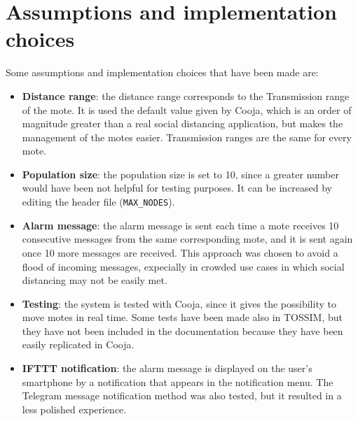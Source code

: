 \documentclass[11pt]{article}
\begin{document}
\section{Assumptions and implementation choices}
Some assumptions and implementation choices that have been made are:
\begin{itemize}
  \item \textbf{Distance range}: the distance range corresponds to the Transmission range of the mote. It is used the default value given by Cooja, which is an order of magnitude greater than a real social distancing application, but makes the management of the motes easier. Transmission ranges are the same for every mote.
  \item \textbf{Population size}: the population size is set to 10, since a greater number would have been not helpful for testing purposes. It can be increased by editing the header file (\texttt{MAX\_NODES}).
  \item \textbf{Alarm message}: the alarm message is sent each time a mote receives 10 consecutive messages from the same corresponding mote, and it is sent again once 10 more messages are received. This approach was chosen to avoid a flood of incoming messages, expecially in crowded use cases in which social distancing may not be easily met.
  \item \textbf{Testing}: the system is tested with Cooja, since it gives the possibility to move motes in real time. Some tests have been made also in TOSSIM, but they have not been included in the documentation because they have been easily replicated in Cooja.
  \item \textbf{IFTTT notification}: the alarm message is displayed on the user's smartphone by a notification that appears in the notification menu. The Telegram message notification method was also tested, but it resulted in a less polished experience.
\end{itemize}
\end{document}
